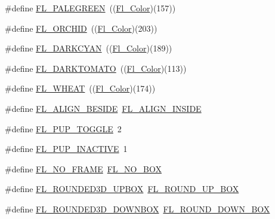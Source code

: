 \begin{DoxyCompactItemize}
\item 
\#define \hyperlink{forms_8_h_a9b0ff913e78b97a3169e27176fcd44b8}{F\+L\+\_\+\+P\+A\+L\+E\+G\+R\+E\+EN}~((\hyperlink{_enumerations_8_h_a8b762953646f8abee866061f1af78a6a}{Fl\+\_\+\+Color})(157))
\item 
\#define \hyperlink{forms_8_h_aeda4440661ba3da828e5051096eafdd3}{F\+L\+\_\+\+O\+R\+C\+H\+ID}~((\hyperlink{_enumerations_8_h_a8b762953646f8abee866061f1af78a6a}{Fl\+\_\+\+Color})(203))
\item 
\#define \hyperlink{forms_8_h_a920c94fd0d0894812f62f5ca38ad6920}{F\+L\+\_\+\+D\+A\+R\+K\+C\+Y\+AN}~((\hyperlink{_enumerations_8_h_a8b762953646f8abee866061f1af78a6a}{Fl\+\_\+\+Color})(189))
\item 
\#define \hyperlink{forms_8_h_aef9db5d8234f3954afd4dc63570758e8}{F\+L\+\_\+\+D\+A\+R\+K\+T\+O\+M\+A\+TO}~((\hyperlink{_enumerations_8_h_a8b762953646f8abee866061f1af78a6a}{Fl\+\_\+\+Color})(113))
\item 
\#define \hyperlink{forms_8_h_a67b4f4b1839f9ec88117e912bfe65a1e}{F\+L\+\_\+\+W\+H\+E\+AT}~((\hyperlink{_enumerations_8_h_a8b762953646f8abee866061f1af78a6a}{Fl\+\_\+\+Color})(174))
\item 
\#define \hyperlink{forms_8_h_a6d75ce92e827afd002a77bb2ba6bb413}{F\+L\+\_\+\+A\+L\+I\+G\+N\+\_\+\+B\+E\+S\+I\+DE}~\hyperlink{_enumerations_8_h_ade440c90fc9c2495fdf04c9cb34fba34}{F\+L\+\_\+\+A\+L\+I\+G\+N\+\_\+\+I\+N\+S\+I\+DE}
\item 
\#define \hyperlink{forms_8_h_adea671ee53bd13747dad7425eaea8239}{F\+L\+\_\+\+P\+U\+P\+\_\+\+T\+O\+G\+G\+LE}~2
\item 
\#define \hyperlink{forms_8_h_a8d028758a552afddd3b6623a180398f5}{F\+L\+\_\+\+P\+U\+P\+\_\+\+I\+N\+A\+C\+T\+I\+VE}~1
\item 
\#define \hyperlink{forms_8_h_a95b0515746a3adfc8d4f0af4336096de}{F\+L\+\_\+\+N\+O\+\_\+\+F\+R\+A\+ME}~\hyperlink{_enumerations_8_h_ae48bf9070f8541de17829f54ccacc6bca48e3b4ff6e390359376e79a8a6bc05c1}{F\+L\+\_\+\+N\+O\+\_\+\+B\+OX}
\item 
\#define \hyperlink{forms_8_h_a7d5bb506f6ca4e150ca97be1e0e3acff}{F\+L\+\_\+\+R\+O\+U\+N\+D\+E\+D3\+D\+\_\+\+U\+P\+B\+OX}~\hyperlink{_enumerations_8_h_a7d2ffbfc7801c6f04562fc18e53b9cd4}{F\+L\+\_\+\+R\+O\+U\+N\+D\+\_\+\+U\+P\+\_\+\+B\+OX}
\item 
\#define \hyperlink{forms_8_h_a282087a1a68b1b1c316c794b5d7aea91}{F\+L\+\_\+\+R\+O\+U\+N\+D\+E\+D3\+D\+\_\+\+D\+O\+W\+N\+B\+OX}~\hyperlink{_enumerations_8_h_a792a19a6999cf43f93a7895e891d40a9}{F\+L\+\_\+\+R\+O\+U\+N\+D\+\_\+\+D\+O\+W\+N\+\_\+\+B\+OX}

\end{DoxyCompactItemize}
